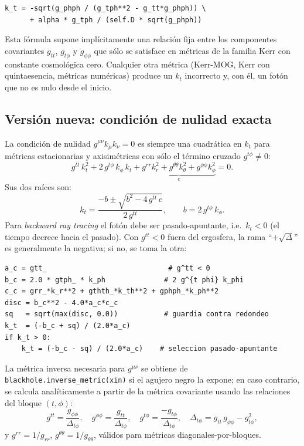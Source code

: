 \documentclass[11pt,a4paper]{article}
\begin{document}
\begin{lstlisting}[style=py, caption={Cálculo de $k_t$ en la versión vieja.}]
k_t = -sqrt(g_phph / (g_tph**2 - g_tt*g_phph)) \
      + alpha * g_tph / (self.D * sqrt(g_phph))
\end{lstlisting}

Esta fórmula supone implícitamente una relación fija entre los
componentes covariantes $g_{tt}$, $g_{t\phi}$ y $g_{\phi\phi}$ que
sólo se satisface en métricas de la familia Kerr con constante
cosmológica cero. Cualquier otra métrica (Kerr-MOG, Kerr con
quintaesencia, métricas numéricas) produce un $k_t$ incorrecto y,
con él, un fotón que no es nulo desde el inicio.

\subsection{Versión nueva: condición de nulidad exacta}

La condición de nulidad $g^{\mu\nu}k_\mu k_\nu = 0$ es siempre una
cuadrática en $k_t$ para métricas estacionarias y axisimétricas con
sólo el término cruzado $g^{t\phi} \neq 0$:
\[
  g^{tt}\,k_t^2
  + 2\,g^{t\phi}\,k_\phi\,k_t
  + \underbrace{g^{rr}k_r^2 + g^{\theta\theta}k_\theta^2
                + g^{\phi\phi}k_\phi^2}_{\displaystyle c}
  = 0.
\]
Sus dos raíces son:
\[
  k_t = \frac{-b \pm \sqrt{b^2 - 4\,g^{tt}\,c}}{2\,g^{tt}},
  \qquad b = 2\,g^{t\phi}\,k_\phi.
\]
Para \emph{backward ray tracing} el fotón debe ser pasado-apuntante,
i.e.\ $k_t < 0$ (el tiempo decrece hacia el pasado). Con
$g^{tt} < 0$ fuera del ergosfera, la rama ``$+\sqrt{\Delta}$'' es
generalmente la negativa; si no, se toma la otra:

\begin{lstlisting}[style=py, caption={Cálculo general de $k_t$ en la versión nueva.}]
a_c = gtt_                             # g^tt < 0
b_c = 2.0 * gtph_ * k_ph              # 2 g^{t phi} k_phi
c_c = grr_*k_r**2 + gthth_*k_th**2 + gphph_*k_ph**2
disc = b_c**2 - 4.0*a_c*c_c
sq   = sqrt(max(disc, 0.0))           # guardia contra redondeo
k_t  = (-b_c + sq) / (2.0*a_c)
if k_t > 0:
    k_t = (-b_c - sq) / (2.0*a_c)    # seleccion pasado-apuntante
\end{lstlisting}

La métrica inversa necesaria para $g^{\mu\nu}$ se obtiene de
\texttt{blackhole.inverse\_metric(xin)} si el agujero negro la expone;
en caso contrario, se calcula analíticamente a partir de la métrica
covariante usando las relaciones del bloque $(t,\phi)$:
\[
  g^{tt} = \frac{g_{\phi\phi}}{\Delta_{t\phi}}, \quad
  g^{\phi\phi} = \frac{g_{tt}}{\Delta_{t\phi}}, \quad
  g^{t\phi} = \frac{-g_{t\phi}}{\Delta_{t\phi}}, \quad
  \Delta_{t\phi} = g_{tt}\,g_{\phi\phi} - g_{t\phi}^2,
\]
y $g^{rr} = 1/g_{rr}$, $g^{\theta\theta} = 1/g_{\theta\theta}$,
válidos para métricas diagonales-por-bloques.
\end{document}
